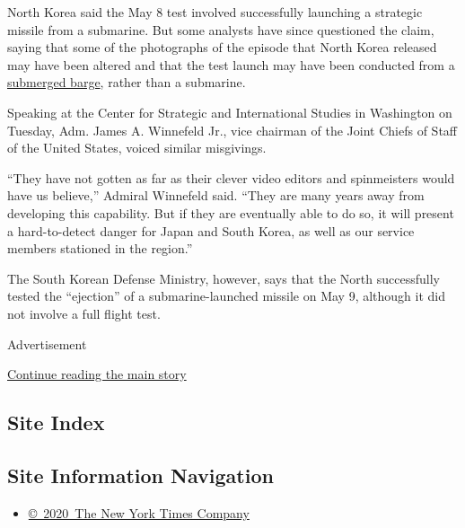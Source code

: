 North Korea said the May 8 test involved successfully launching a
strategic missile from a submarine. But some analysts have since
questioned the claim, saying that some of the photographs of the episode
that North Korea released may have been altered and that the test launch
may have been conducted from a
\href{http://38north.org/2015/05/jbermudez051315/}{submerged barge},
rather than a submarine.

Speaking at the Center for Strategic and International Studies in
Washington on Tuesday, Adm. James A. Winnefeld Jr., vice chairman of the
Joint Chiefs of Staff of the United States, voiced similar misgivings.

``They have not gotten as far as their clever video editors and
spinmeisters would have us believe,'' Admiral Winnefeld said. ``They are
many years away from developing this capability. But if they are
eventually able to do so, it will present a hard-to-detect danger for
Japan and South Korea, as well as our service members stationed in the
region.''

The South Korean Defense Ministry, however, says that the North
successfully tested the ``ejection'' of a submarine-launched missile on
May 9, although it did not involve a full flight test.

Advertisement

\protect\hyperlink{after-bottom}{Continue reading the main story}

\hypertarget{site-index}{%
\subsection{Site Index}\label{site-index}}

\hypertarget{site-information-navigation}{%
\subsection{Site Information
Navigation}\label{site-information-navigation}}

\begin{itemize}
\tightlist
\item
  \href{https://help.nytimes.com/hc/en-us/articles/115014792127-Copyright-notice}{©~2020~The
  New York Times Company}
\end{itemize}

